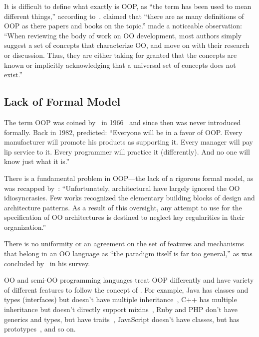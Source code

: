 It is difficult to define what exactly is OOP, as
``the term has been used to mean different things,'' according to~\citet{stefik1985object}.
\citet{madsen1988object} claimed that ``there are as many
definitions of OOP as there papers and books on the topic.''
\citet{armstrong2006quarks} made a noticeable observation: ``When
reviewing the body of work on OO development, most authors simply suggest a set
of concepts that characterize OO, and move on with their research or discussion.
Thus, they are either taking for granted that the concepts are known or implicitly
acknowledging that a universal set of concepts does not exist.''

\subsection{Lack of Formal Model}

The term OOP was coined by~\citet{kay97keynote} in 1966~\cite{kaymaster68}
and since then was never introduced formally.
Back in 1982, \citet{rentsch1982object} predicted: ``Everyone will be in a favor
of OOP. Every manufacturer will promote his products as supporting it. Every
manager will pay lip service to it. Every programmer will practice
it (differently). And no one will know just what it is.''

There is a fundamental problem in OOP---the lack of a rigorous formal model,
as was recapped by~\citet{eden2001principles}: ``Unfortunately, architectural
 have largely ignored the OO idiosyncrasies. Few works recognized the
elementary building blocks of design and architecture patterns.
As a result of this oversight, any attempt to use  for the specification of OO
architectures is destined to neglect key regularities in their organization.''

There is no uniformity or an agreement on the set of features and mechanisms
that belong in an OO language as ``the paradigm itself is far too general,'' as was
concluded by~\citet{nierstrasz1989survey} in his survey.

OO and semi-OO programming languages treat OOP differently and have variety of
different features to follow the concept of . For
example, Java has classes and types (interfaces) but doesn't
have multiple inheritance~\citep{alpern2001efficient},
C++ has multiple inheritance but doesn't directly support mixins~\citep{burton2014using},
Ruby and PHP don't have generics and types, but have traits~\citep{bi2018typed},
JavaScript doesn't have classes, but has prototypes~\citep{richards2010analysis}, and so on.


